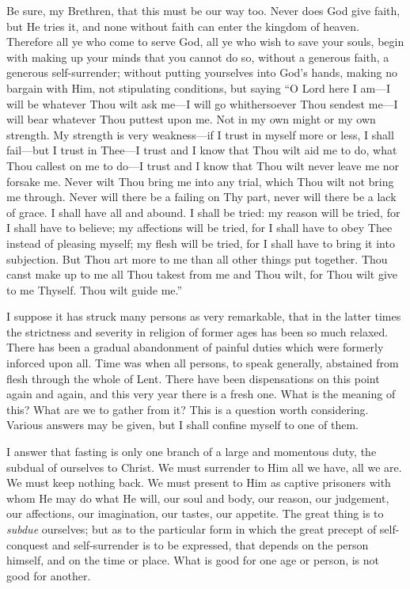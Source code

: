 Be sure, my Brethren, that this must be our way
too. Never does God give faith, but He tries it, and none without
faith can enter the kingdom of heaven. Therefore all ye who come to
serve God, all ye who wish to save your souls, begin with making up
your minds that you cannot do so, without a generous faith, a generous
self-surrender; without putting yourselves into God's hands, making no
bargain with Him, not stipulating conditions, but saying ``O Lord
here I am—I will be whatever Thou wilt ask me—I will go
whithersoever Thou sendest me—I will bear whatever Thou puttest upon
me. Not in my own might or my own strength. My strength is very
weakness—if I trust in myself more or less, I shall fail—but I
trust in Thee—I trust and I know that Thou wilt aid me to do, what
Thou callest on me to do—I trust and I know that Thou wilt never
leave me nor forsake me. Never wilt Thou bring me into any trial,
which Thou wilt not bring me through. Never will there be a failing on
Thy part, never will there be a lack of grace. I shall have all and
abound. I shall be tried: my reason will be tried, for I shall have to
believe; my affections will be tried, for I shall have to obey Thee
instead of pleasing myself; my flesh will be tried, for I shall have
to bring it into subjection. But Thou art more to me than all other
things put together. Thou canst make up to me all Thou takest from me
and Thou wilt, for Thou wilt give to me Thyself. Thou wilt guide me.''



I suppose it has struck many persons as very
remarkable, that in the latter times the strictness and severity in
religion of former ages has been so much relaxed. There has been a
gradual abandonment of painful duties which were formerly inforced
upon all. Time was when all persons, to speak generally, abstained
from flesh through the whole of Lent. There have been dispensations on
this point again and again, and this very year there is a fresh one.
What is the meaning of this? What are we to gather from it? This is a
question worth considering. Various answers may be given, but I shall
confine myself to one of them.

I answer that fasting is only one branch of a
large and momentous duty, the subdual of ourselves to Christ. We must
surrender to Him all we have, all we are. We must keep nothing back.
We must present to Him as captive prisoners with whom He may do what
He will, our soul and body, our reason, our judgement, our affections, our imagination, our tastes, our appetite. The great
thing is to \emph{subdue} ourselves; but as to the particular form in
which the great precept of self-conquest and self-surrender is to be
expressed, that depends on the person himself, and on the time or
place. What is good for one age or person, is not good for another.

